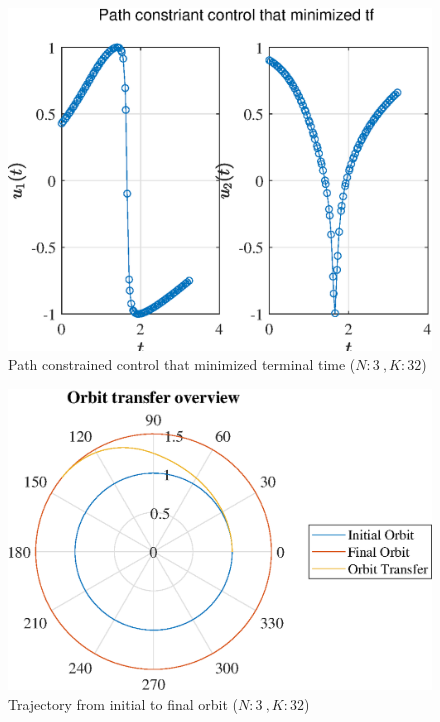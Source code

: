 \documentclass[]{article}
\begin{document}
	\begin{figure}
		\centering
		\includegraphics[scale=0.75]{path_N3_K32_C3_tf.eps}
		\caption{Path constrained control that minimized terminal time (\(N:3\ , K:32\))}
		\label{fig:path_N3_K32_C3_tf}
	\end{figure}
	\begin{figure}
		\centering
		\includegraphics[scale=0.75]{orbit_N3_K32_C3_tf.eps}
		\caption{Trajectory from initial to final orbit (\(N:3\ , K:32\))}
		\label{fig:orbit_N3_K32_C3_tf}
	\end{figure}
\end{document}
